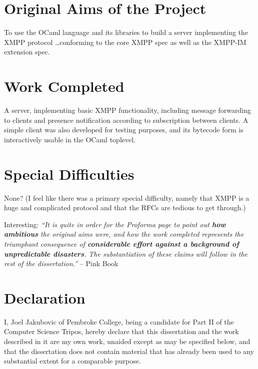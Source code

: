 \documentclass[12pt,a4paper,twoside,openright]{report}
\begin{document}
{\section*{Original Aims of the Project}

To use the OCaml language and its libraries to build a server implementing the XMPP protocol \ldots conforming to the core XMPP spec as well as the XMPP-IM extension spec.

\section*{Work Completed}

A server, implementing basic XMPP functionality, including message forwarding to clients and presence notification according to subscription between clients. A simple client was also developed for testing purposes, and its bytecode form is interactively usable in the OCaml toplevel.

\section*{Special Difficulties}

None? (I feel like there was a primary special difficulty, namely that XMPP is a huge and complicated protocol and that the RFCs are tedious to get through.)

Interesting: \textit{``It is quite in order for the Proforma page to point out \textbf{how ambitious} the original aims were, and how the work completed represents the triumphant consequence of \textbf{considerable effort against a background of unpredictable disasters}. The substantiation of these claims will follow in the rest of the dissertation.''} -- Pink Book

\newpage
\section*{Declaration}

I, Joel Jakubovic of Pembroke College, being a candidate for Part II of the Computer
Science Tripos, hereby declare
that this dissertation and the work described in it are my own work,
unaided except as may be specified below, and that the dissertation
does not contain material that has already been used to any substantial
extent for a comparable purpose.

\bigskip
{}

\medskip
{}

}
\end{document}
